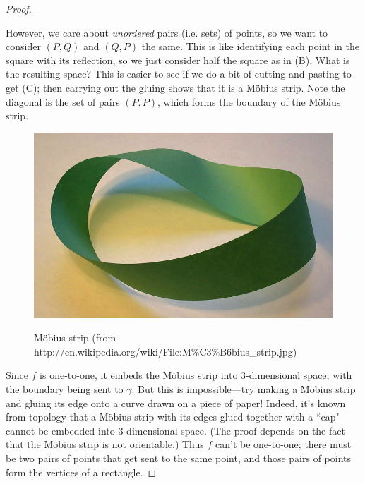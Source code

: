 \documentclass[12pt,twoside]{article}
\theoremstyle{norm}
\begin{document}
\begin{proof}
\begin{figure}[h!]
\end{figure}

However, we care about {\it unordered} pairs (i.e. sets) of points, so we want to consider $(P,Q)$  and $(Q,P)$ the same. This is like identifying each point in the square with its reflection, so we just consider half the square as in (B). What is the resulting space? This is easier to see if we do a bit of cutting and pasting to get (C); then carrying out the gluing shows that it is a M\"obius strip. Note the diagonal is the set of pairs $(P,P)$, which forms the boundary of the M\"obius strip.

\begin{figure}[h!]
\centering
\includegraphics[scale=0.25]{mobius}\\
\caption{
M\"obius strip (from http://en.wikipedia.org/wiki/File:M\%C3\%B6bius\_strip.jpg)}
\end{figure}

Since $f$ is one-to-one, it embeds the M\"obius strip into 3-dimensional space, with the boundary being sent to $\gamma$. But this is impossible---try making a M\"obius strip and gluing its edge onto a curve drawn on a piece of paper! Indeed, it's known from topology that a M\"obius strip with its edges glued together with a ``cap" cannot be embedded into 3-dimensional space. (The proof depends on the fact that the M\"obius strip is not orientable.) Thus $f$ can't be one-to-one; there must be two pairs of points that get sent to the same point, and those pairs of points form the vertices of a rectangle. 
\end{proof}
\end{document}
